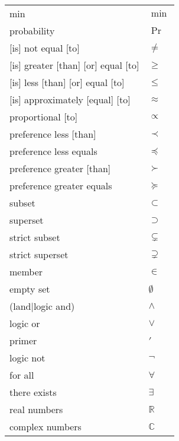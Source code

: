 \documentclass[12pt, a4paper]{article}
\begin{document}
\begin{longtable}{ll}
min & $\min$ \\
probability & $\Pr$ \\
{[is]} not equal [to] & $\neq$ \\
{[is]} greater [than] [or] equal [to] & $\geq$ \\
{[is]} less [than] [or] equal [to] & $\leq$ \\
{[is]} approximately [equal] [to] & $\approx$ \\
proportional [to] & $\propto$ \\
preference less [than] & $\prec$ \\
preference less equals & $\preceq$ \\
preference greater [than] & $\succ$ \\
preference greater equals & $\succeq$ \\
subset & $\subset$ \\
superset & $\supset$ \\
strict subset & $\subsetneq$ \\
strict superset & $\supsetneq$ \\
member & $\in$ \\
empty set & $\emptyset$ \\
(land|logic and) & $\land$ \\
logic or & $\lor$ \\
primer & $\prime$ \\
logic not & $\lnot$ \\
for all & $\forall$ \\
there exists & $\exists$ \\
real numbers & $\mathbb{R}$ \\
complex numbers & $\mathbb{C}$ \\

\end{longtable}
\end{document}
